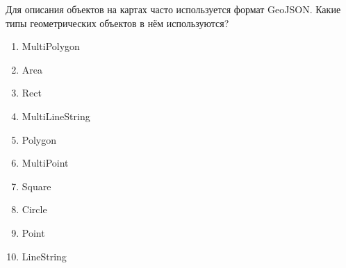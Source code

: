 
Для описания объектов на картах часто используется формат GeoJSON. Какие типы геометрических объектов в нём используются?


\begin{enumerate}
    \item MultiPolygon
    \item Area
    \item Rect
    \item MultiLineString
    \item Polygon
    \item MultiPoint
    \item Square
    \item Circle
    \item Point
    \item LineString
\end{enumerate}